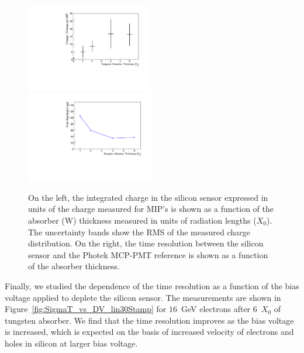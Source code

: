 \documentclass[12pt]{article}
\begin{document}
{\begin{figure}[htbp] 
\centering
\includegraphics[width=0.49\textwidth]{plots/MIPVsAbsorberAt8GeV.pdf} 
\includegraphics[width=0.5\textwidth]{plots/SigmaT_vs_X0_lin30Stamp.pdf} 
\caption{On the left, the integrated charge in the silicon sensor expressed in units of the 
charge measured for MIP's is shown as a function of the absorber (W) thickness measured in
units of radiation lengths ($X_{0}$). The uncertainty bands show the RMS of the measured charge 
distribution. On the right, the time resolution between the silicon 
sensor and the Photek MCP-PMT reference is shown as a function of the 
absorber thickness.
} 
\label{fig:MIPVsAbsorberAt8GeV} 
\end{figure} 

Finally, we studied the dependence of the time resolution as a function of the
bias voltage applied to deplete the silicon sensor. The measurements are shown
in Figure~\ref{fig:SigmaT_vs_DV_lin30Stamp} for $16$~GeV electrons after
6~$X_0$ of tungsten absorber. We find that the time resolution
improves as the bias voltage is increased, which is expected on the basis of 
increased velocity of electrons and holes in silicon at larger bias voltage. 

}
\end{document}
